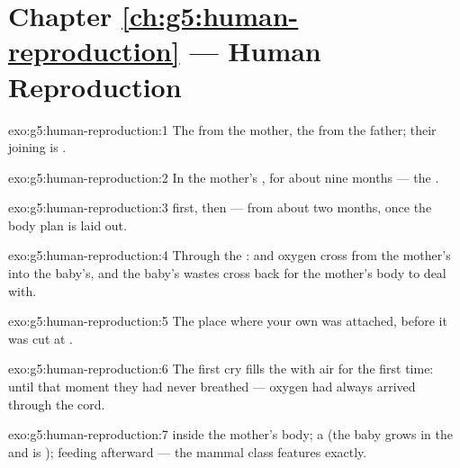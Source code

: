 \section*{Chapter \ref{ch:g5:human-reproduction} --- Human Reproduction}

\begin{solution}{exo:g5:human-reproduction:1}
The  from the mother, the  from the father;
their joining is .
\end{solution}

\begin{solution}{exo:g5:human-reproduction:2}
In the mother's , for about nine months --- the .
\end{solution}

\begin{solution}{exo:g5:human-reproduction:3}
 first, then  --- from about two months, once the
body plan is laid out.
\end{solution}

\begin{solution}{exo:g5:human-reproduction:4}
Through the :  and oxygen cross from
the mother's  into the baby's, and the baby's wastes
cross back for the mother's body to deal with.
\end{solution}

\begin{solution}{exo:g5:human-reproduction:5}
The place where your own  was attached, before
it was cut at .
\end{solution}

\begin{solution}{exo:g5:human-reproduction:6}
The first cry fills the  with air for the first time:
until that moment they had never breathed --- oxygen had
always arrived through the cord.
\end{solution}

\begin{solution}{exo:g5:human-reproduction:7}
 inside the mother's body; a  
(the baby grows in the  and is );  feeding
afterward --- the mammal class features exactly.
\end{solution}

